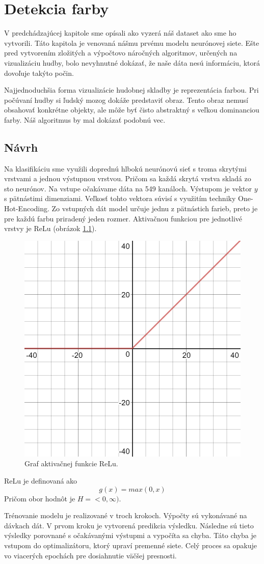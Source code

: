\chapter{Detekcia farby}

V predchádzajúcej kapitole sme opísali ako vyzerá náš dataset ako sme ho vytvorili.
Táto kapitola je venovaná nášmu prvému modelu neurónovej siete.
Ešte pred vytvorením zložitých a výpočtovo náročných algoritmov, určených na vizualizáciu hudby, bolo nevyhnutné dokázať, že naše dáta nesú informáciu, ktorá dovoľuje takýto počin.

Najjednoduchšia forma vizualizácie hudobnej skladby je reprezentácia farbou.
Pri počúvaní hudby si ľudský mozog dokáže predstaviť obraz.
Tento obraz nemusí obsahovať konkrétne objekty, ale môže byť čisto abstraktný s veľkou dominanciou farby.
Náš algoritmus by mal dokázať podobnú vec.

\section{Návrh}
Na klasifikáciu sme využili doprednú hlbokú neurónovú sieť s troma skrytými vrstvami a jednou výstupnou vrstvou.
Pričom sa každá skrytá vrstva skladá zo sto neurónov.
Na vstupe očakávame dáta na 549 kanáloch.
Výstupom je vektor \(y\) s pätnástimi dimenziami.
Veľkosť tohto vektora súvisí s využitím techniky One-Hot-Encoding.
Zo vstupných dát model určuje jednu z pätnástich farieb, preto je pre každú farbu priradený jeden rozmer.
Aktivačnou funkciou pre jednotlivé vrstvy je ReLu (obrázok \ref{relu}).
\begin{figure}[!ht]
	\centering
	\includegraphics[width=.4\textwidth]{figures/relu}
	\caption{Graf aktivačnej funkcie ReLu.}
	\label{relu}
\end{figure}
ReLu je definovaná ako \[g(x) = max(0, x)\]
Pričom obor hodnôt je \(H = <0, \infty)\).

Trénovanie modelu je realizované v troch krokoch.
Výpočty sú vykonávané na dávkach dát.
V prvom kroku je vytvorená predikcia výsledku.
Následne sú tieto výsledky porovnané s očakávanými výstupmi a vypočíta sa chyba.
Táto chyba je vstupom do optimalizátoru, ktorý upraví premenné siete.
Celý proces sa opakuje vo viacerých epochách pre dosiahnutie väčšej presnosti.


